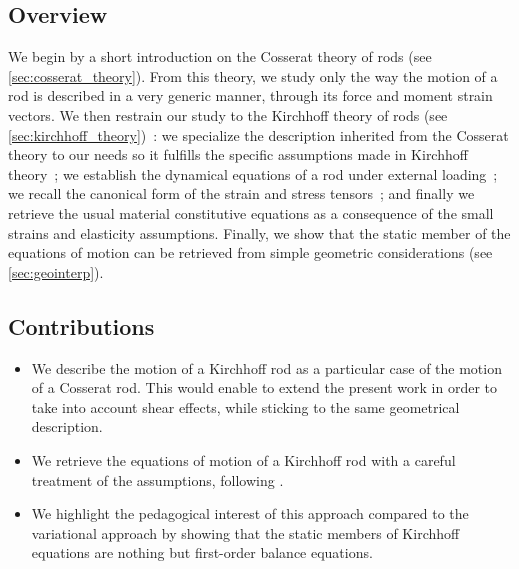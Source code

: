 %
%
%

\subsection{Overview}

We begin by a short introduction on the Cosserat theory of rods (see \cref{sec:cosserat_theory}). From this theory, we study only the way the motion of a rod is described in a very generic manner, through its force and moment strain vectors. We then restrain our study to the Kirchhoff theory of rods (see \cref{sec:kirchhoff_theory})~: we specialize the description inherited from the Cosserat theory to our needs so it fulfills the specific assumptions made in Kirchhoff theory~; we establish the dynamical equations of a rod under external loading~; we recall the canonical form of the strain and stress tensors~; and finally we retrieve the usual material constitutive equations as a consequence of the small strains and elasticity assumptions. Finally, we show that the static member of the equations of motion can be retrieved from simple geometric considerations (see \cref{sec:geointerp}).

\subsection{Contributions}
\begin{itemize}
\item We describe the motion of a Kirchhoff rod as a particular case of the motion of a Cosserat rod. This would enable to extend the present work in order to take into account shear effects, while sticking to the same geometrical description.
\item We retrieve the equations of motion of a Kirchhoff rod with a careful treatment of the assumptions, following \cite{Dill1992}.
\item We highlight the pedagogical interest of this approach compared to the variational approach by showing that the static members of Kirchhoff equations are nothing but first-order balance equations.
\end{itemize}

